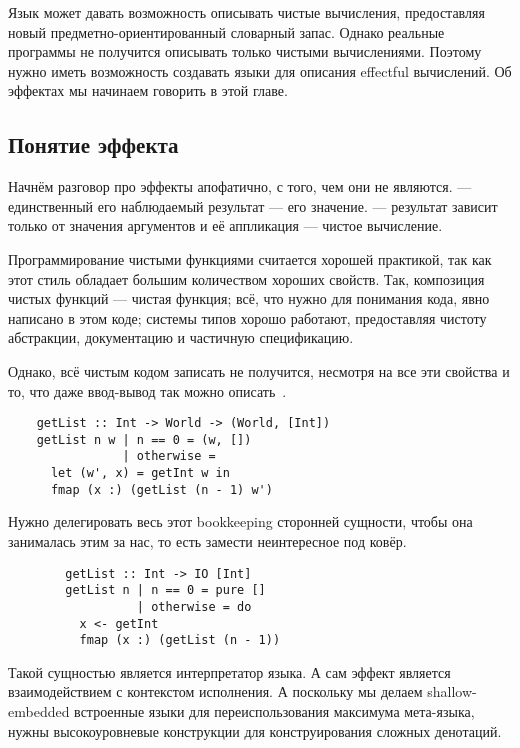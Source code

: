 
Язык может давать возможность описывать чистые вычисления, предоставляя новый предметно-ориентированный словарный запас.
Однако реальные программы не получится описывать только чистыми вычислениями.
Поэтому нужно иметь возможность создавать языки для описания effectful вычислений.
Об эффектах мы начинаем говорить в этой главе.

\subsection{Понятие эффекта}

Начнём разговор про эффекты апофатично, с того, чем они не являются.
 --- единственный его наблюдаемый результат --- его значение.
 --- результат зависит только от значения аргументов и её аппликация --- чистое вычисление.

Программирование чистыми функциями считается хорошей практикой, так как этот стиль обладает большим количеством хороших свойств.
Так, композиция чистых функций --- чистая функция; всё, что нужно для понимания кода, явно написано в этом коде; системы типов хорошо работают, предоставляя чистоту абстракции, документацию и частичную спецификацию.

Однако, всё чистым кодом записать не получится, несмотря на все эти свойства и то, что даже ввод-вывод так можно описать~\cite{jones2001tackling}. %
\begin{verbatim}
    getList :: Int -> World -> (World, [Int])
    getList n w | n == 0 = (w, [])
                | otherwise =
      let (w', x) = getInt w in
      fmap (x :) (getList (n - 1) w')
\end{verbatim}

Нужно делегировать весь этот bookkeeping сторонней сущности, чтобы она занималась этим за нас, то есть замести неинтересное под ковёр. %

\begin{verbatim}
        getList :: Int -> IO [Int]
        getList n | n == 0 = pure []
                  | otherwise = do
          x <- getInt
          fmap (x :) (getList (n - 1))
\end{verbatim}

Такой сущностью является интерпретатор языка.
А сам эффект является взаимодействием с контекстом исполнения.
А поскольку мы делаем shallow-embedded встроенные языки для переиспользования максимума мета-языка, нужны высокоуровневые конструкции для конструирования сложных денотаций.

